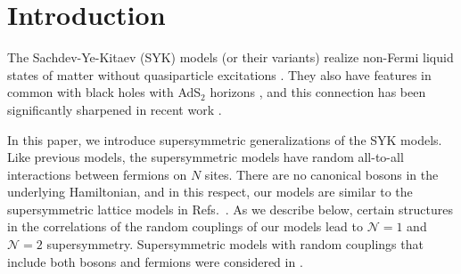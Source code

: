 \documentclass[aps,pre,preprint,onecolumn,citeautoscript,superscriptaddress,nofootinbib,eqsecnum]{revtex4-1}
\begin{document}
\tableofcontents


\section{Introduction}
\label{sec:intro}

The Sachdev-Ye-Kitaev (SYK) models (or their variants) realize non-Fermi liquid states of matter without quasiparticle excitations \cite{SY92,PG98,GPS99,GPS01}.
They also have features in common with 
 black holes with AdS$_2$ horizons \cite{SS10,SS10b}, and this connection has been significantly
sharpened in recent work \cite{kitaev2015talk,AAJP15,AABK16,SS15,Hosur15,JPRV16,YLX16,WFSS16,Jevicki16,Jevicki16b,JMDS16,JMDS16b,DHT16,Garcia-Alvarez:2016wem,HV16,KJ16,BAK16,CP16,GQS16}. 

In this paper, we introduce supersymmetric generalizations of the SYK models. Like previous models, the supersymmetric models
have random all-to-all interactions between fermions on $N$ sites. There are no canonical bosons in the underlying Hamiltonian,
and in this respect, our models are similar to the supersymmetric 
lattice models in Refs.~\cite{FSB03,FNS03,FS05,Liza08,Liza09,Liza11,Liza12}.
As we describe below, certain structures in the
correlations of the random couplings of our models lead to $\mathcal{N}=1$ and $\mathcal{N}=2$ supersymmetry. 
Supersymmetric models with random couplings that include both bosons and fermions were considered in \cite{Anninos:2016szt}.
\end{document}

